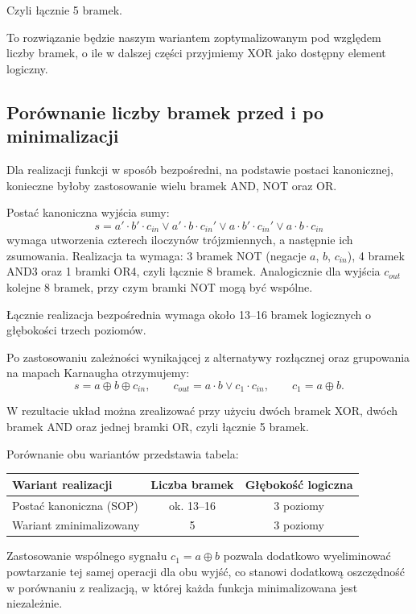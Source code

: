 Czyli łącznie 5 bramek.

To rozwiązanie będzie naszym wariantem zoptymalizowanym pod względem liczby bramek, o ile w dalszej części przyjmiemy XOR jako dostępny element logiczny.

\subsection{Porównanie liczby bramek przed i po minimalizacji}

Dla realizacji funkcji w sposób bezpośredni, na podstawie postaci kanonicznej, konieczne byłoby zastosowanie wielu bramek AND, NOT oraz OR.

Postać kanoniczna wyjścia sumy:
\begin{equation*}
s = a' \cdot b' \cdot c_{in} \vee a' \cdot b \cdot c_{in}' \vee a \cdot b' \cdot c_{in}' \vee a \cdot b \cdot c_{in}
\end{equation*}
wymaga utworzenia czterech iloczynów trójzmiennych, a następnie ich zsumowania. Realizacja ta wymaga: 3 bramek NOT (negacje $a$, $b$, $c_{in}$), 4 bramek AND3 oraz 1 bramki OR4, czyli łącznie 8 bramek. Analogicznie dla wyjścia $c_{out}$ kolejne 8 bramek, przy czym bramki NOT mogą być wspólne.

Łącznie realizacja bezpośrednia wymaga około 13--16 bramek logicznych o głębokości trzech poziomów.

Po zastosowaniu zależności wynikającej z alternatywy rozłącznej oraz grupowania na mapach Karnaugha otrzymujemy:
\begin{equation*}
s = a \oplus b \oplus c_{in}, \qquad c_{out} = a \cdot b \vee c_1 \cdot c_{in}, \qquad c_1 = a \oplus b.
\end{equation*}

W rezultacie układ można zrealizować przy użyciu dwóch bramek XOR, dwóch bramek AND oraz jednej bramki OR, czyli łącznie 5 bramek.

Porównanie obu wariantów przedstawia tabela:

\begin{center}
\begin{tabular}{|l|c|c|}
\hline
\textbf{Wariant realizacji} & \textbf{Liczba bramek} & \textbf{Głębokość logiczna} \\
\hline
Postać kanoniczna (SOP) & ok. 13--16 & 3 poziomy \\
Wariant zminimalizowany & 5 & 3 poziomy \\
\hline
\end{tabular}
\end{center}

Zastosowanie wspólnego sygnału $c_1 = a \oplus b$ pozwala dodatkowo wyeliminować powtarzanie tej samej operacji dla obu wyjść, co stanowi dodatkową oszczędność w porównaniu z realizacją, w której każda funkcja minimalizowana jest niezależnie.
